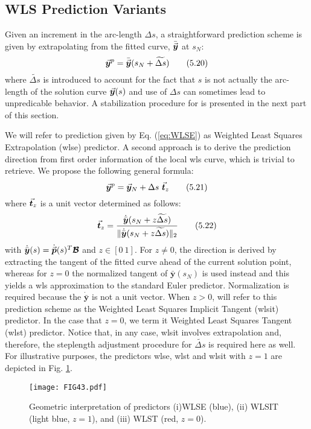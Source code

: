 \subsection{WLS Prediction Variants}\label{CH5-S2SS2}

Given an increment in the arc-length $\Delta s$, a straightforward prediction
scheme is given by extrapolating from the fitted curve, $\bar{\vec{\bm{y}}}$ at 
$s_N$:
\begin{equation}
	\vec{\bm{y}}^p = \bar{\vec{\bm{y}}}(s_N+\widetilde{\Delta s})
	\tag{5.20}\label{eq:WLSE}
\end{equation}
where $\widetilde{\Delta s}$ is introduced to account for the fact that $s$ is
not actually the arc-length of the solution curve $\vec{\bm{y}}(s)$ and use of 
$\Delta s$ can 
sometimes lead to unpredicable behavior. A stabilization procedure for is 
presented in the next part of this section. 

We will refer to prediction given by Eq. (\ref{eq:WLSE}) as Weighted Least 
Squares 
Extrapolation (\acrshort{wlse}) predictor. A second approach is to derive the 
prediction direction from first order
information of the local \acrshort{wls} curve, which is trivial to retrieve. We 
propose the following general formula:
\begin{equation}
	\vec{\bm{y}}^p = \vec{\bm{y}}_N + \Delta s\ \vec{\bm{t}}_z
	\tag{5.21}\label{eq:WLSIT}
\end{equation}
where $\vec{\bm{t}}_z$ is a unit vector determined as follows:
\begin{equation}
	\vec{\bm{t}}_z = \dfrac{\dot{\bar{\bm{y}}}(s_N+z\widetilde{\Delta
			s})}{\Vert\dot{\bar{\bm{y}}}(s_N+z\widetilde{\Delta s})\Vert_2}
	\tag{5.22}\label{eq:ImplicitTangent}
\end{equation}
with $\dot{\bar{\bm{y}}}(s)=\dot{\vec{\bm{p}}}(s)^T\bm{\mathcal{B}}$ and $z\in[0\ 
1]$. For
$z\neq 0$, the direction is derived by extracting the tangent of the fitted
curve ahead of the current solution point, whereas for $z=0$ the normalized 
tangent of $\bar{\bm{y}}(s_N)$ is used instead and this yields a
\acrshort{wls} approximation to the standard Euler predictor. Normalization is 
required
because the $\dot{\bar{\bm{y}}}$ is not a unit vector. When $z>0$, will refer to
this prediction scheme as the Weighted Least Squares Implicit Tangent 
(\acrshort{wlsit}) predictor. In the case that $z=0$, we term it Weighted Least 
Squares Tangent
(\acrshort{wlst}) predictor. Notice that, in any case, \acrshort{wlsit} 
involves extrapolation and,
therefore, the steplength adjustment procedure for $\widetilde{\Delta s}$ is
required here as well. For illustrative purposes, the predictors 
\acrshort{wlse}, \acrshort{wlst}
and \acrshort{wlsit} with $z=1$ are depicted in Fig.
\ref{fig:DifferentialPredictors}.
\begin{figure}[t]
	\centering
	\texttt{[image: FIG43.pdf]}
	\caption{Geometric interpretation of predictors (i)WLSE (blue), (ii) WLSIT
		(light blue, $z=1$), and (iii) WLST (red, $z=0$).}
	\label{fig:DifferentialPredictors}
\end{figure}

